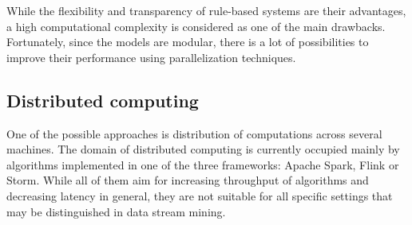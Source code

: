 \documentclass[journal]{IEEEtran}
\begin{document}
While the flexibility and transparency of rule-based systems are their advantages, a high computational complexity is considered as one of the main drawbacks. Fortunately, since the models are modular, there is a lot of possibilities to improve their performance using parallelization techniques.

\subsection{Distributed computing}

One of the possible approaches is distribution of computations across several machines. The domain of distributed computing is currently occupied mainly by algorithms implemented in one of the three frameworks: Apache Spark, Flink or Storm. While all of them aim for increasing throughput of algorithms and decreasing latency in general, they are not suitable for all specific settings that may be distinguished in data stream mining.
\end{document}
